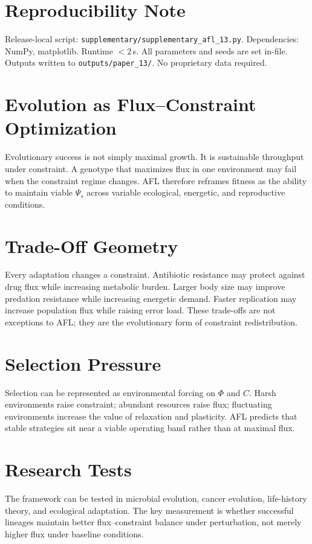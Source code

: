 \documentclass[11pt]{article}
\begin{document}
\section{Reproducibility Note}

Release-local script: \texttt{supplementary/supplementary\_afl\_13.py}. Dependencies: NumPy, matplotlib. Runtime $< 2$\,s. All parameters and seeds are set in-file. Outputs written to \texttt{outputs/paper\_13/}. No proprietary data required.



\section{Evolution as Flux--Constraint Optimization}
Evolutionary success is not simply maximal growth. It is sustainable throughput under constraint. A genotype that maximizes flux in one environment may fail when the constraint regime changes. AFL therefore reframes fitness as the ability to maintain viable $\Psi_s$ across variable ecological, energetic, and reproductive conditions.

\section{Trade-Off Geometry}
Every adaptation changes a constraint. Antibiotic resistance may protect against drug flux while increasing metabolic burden. Larger body size may improve predation resistance while increasing energetic demand. Faster replication may increase population flux while raising error load. These trade-offs are not exceptions to AFL; they are the evolutionary form of constraint redistribution.

\section{Selection Pressure}
Selection can be represented as environmental forcing on $\Phi$ and $C$. Harsh environments raise constraint; abundant resources raise flux; fluctuating environments increase the value of relaxation and plasticity. AFL predicts that stable strategies sit near a viable operating band rather than at maximal flux.

\section{Research Tests}
The framework can be tested in microbial evolution, cancer evolution, life-history theory, and ecological adaptation. The key measurement is whether successful lineages maintain better flux--constraint balance under perturbation, not merely higher flux under baseline conditions.
\end{document}
